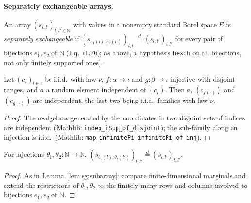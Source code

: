 \paragraph{Separately exchangeable arrays.}
An array $(s_{l,l'})_{l,l'\in\mathbb N}$ with values in a nonempty standard Borel space $E$ is \emph{separately exchangeable} if $(s_{e_1(l),e_2(l')})_{l,l'}\overset d=(s_{l,l'})_{l,l'}$ for every pair of bijections $e_1,e_2$ of $\mathbb N$ (Eq.~(1.76); as above, a hypothesis \texttt{hexch} on all bijections, not only finitely supported ones).

\begin{lemma}\label{lem:sg:iid-split}
  \leanok
Let $(c_i)_{i\in\iota}$ be i.i.d.\ with law $\nu$, $f:\alpha\to\iota$ and $g:\beta\to\iota$ injective with disjoint ranges, and $a$ a random element independent of $(c_i)$. Then $a$, $(c_{f(\cdot)})$ and $(c_{g(\cdot)})$ are independent, the last two being i.i.d.\ families with law $\nu$.
\end{lemma}

\begin{proof}
  \leanok
The $\sigma$-algebras generated by the coordinates in two disjoint sets of indices are independent (Mathlib: \texttt{indep\_iSup\_of\_disjoint}); the sub-family along an injection is i.i.d.\ (Mathlib: \texttt{map\_infinitePi\_infinitePi\_of\_inj}).
\end{proof}

\begin{lemma}\label{lem:sg:subarray-sep}
  \leanok
For injections $\theta_1,\theta_2:\mathbb N\to\mathbb N$, $(s_{\theta_1(l),\theta_2(l')})_{l,l'}\overset d=(s_{l,l'})_{l,l'}$.
\end{lemma}

\begin{proof}
  \leanok
{}
As in Lemma~\ref{lem:sg:subarray}: compare finite-dimensional marginals and extend the restrictions of $\theta_1,\theta_2$ to the finitely many rows and columns involved to bijections $e_1,e_2$ of $\mathbb N$.
\end{proof}

